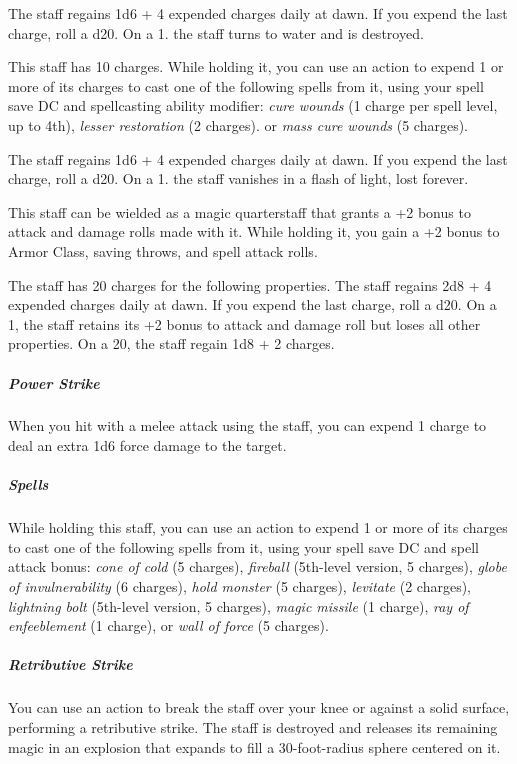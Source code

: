 \documentclass[10pt,a4paper,twoside,bg=print,twocolumn,openany,nodeprecatedcode]{dndbook}
\begin{document}
The staff regains 1d6 + 4 expended charges daily at dawn. If you expend the last charge, roll a d20. On a 1. the staff turns to water and is destroyed.

This staff has 10 charges. While holding it, you can use an action to expend 1 or more of its charges to cast one of the following spells from it, using your spell save DC and spellcasting ability modifier: \textit{cure wounds} (1 charge per spell level, up to 4th), \textit{lesser restoration} (2 charges). or \textit{mass cure wounds} (5 charges).

The staff regains 1d6 + 4 expended charges daily at dawn. If you expend the last charge, roll a d20. On a 1. the staff vanishes in a flash of light, lost forever.

This staff can be wielded as a magic quarterstaff that grants a +2 bonus to attack and damage rolls made with it. While holding it, you gain a +2 bonus to Armor Class, saving throws, and spell attack rolls.

The staff has 20 charges for the following properties. The staff regains 2d8 + 4 expended charges daily at dawn. If you expend the last charge, roll a d20. On a 1, the staff retains its +2 bonus to attack and damage roll but loses all other properties. On a 20, the staff regain 1d8 + 2 charges.

\subparagraph{Power Strike}
When you hit with a melee attack using the staff, you can expend 1 charge to deal an extra 1d6 force damage to the target.

\subparagraph{Spells}
While holding this staff, you can use an action to expend 1 or more of its charges to cast one of the following spells from it, using your spell save DC and spell attack bonus: \textit{cone of cold} (5 charges), \textit{fireball} (5th-level version, 5 charges), \textit{globe of invulnerability} (6 charges), \textit{hold monster} (5 charges), \textit{levitate} (2 charges), \textit{lightning bolt} (5th-level version, 5 charges), \textit{magic missile} (1 charge), \textit{ray of enfeeblement} (1 charge), or \textit{wall of force} (5 charges).

\subparagraph{Retributive Strike}
You can use an action to break the staff over your knee or against a solid surface, performing a retributive strike. The staff is destroyed and releases its remaining magic in an explosion that expands to fill a 30-foot-radius sphere centered on it.
\end{document}
